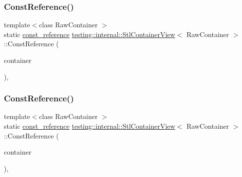 \mbox{\label{classtesting_1_1internal_1_1_stl_container_view_a36eccf53329730f6e55c12002128bf25}} 
\subsubsection{\texorpdfstring{ConstReference()}{ConstReference()}\hspace{0.1cm}{\footnotesize\ttfamily [2/3]}}
{\footnotesize\ttfamily template$<$class Raw\+Container $>$ \\
static \mbox{\hyperlink{classtesting_1_1internal_1_1_stl_container_view_a9cd4f6ed689b3938cdb7b3c4cbf1b36b}{const\+\_\+reference}} \mbox{\hyperlink{classtesting_1_1internal_1_1_stl_container_view}{testing\+::internal\+::\+Stl\+Container\+View}}$<$ Raw\+Container $>$\+::Const\+Reference (\begin{DoxyParamCaption}\item[{const Raw\+Container \&}]{container }\end{DoxyParamCaption})\hspace{0.3cm}{\ttfamily [inline]}, {\ttfamily [static]}}

\mbox{\label{classtesting_1_1internal_1_1_stl_container_view_a36eccf53329730f6e55c12002128bf25}} 
\subsubsection{\texorpdfstring{ConstReference()}{ConstReference()}\hspace{0.1cm}{\footnotesize\ttfamily [3/3]}}
{\footnotesize\ttfamily template$<$class Raw\+Container $>$ \\
static \mbox{\hyperlink{classtesting_1_1internal_1_1_stl_container_view_a9cd4f6ed689b3938cdb7b3c4cbf1b36b}{const\+\_\+reference}} \mbox{\hyperlink{classtesting_1_1internal_1_1_stl_container_view}{testing\+::internal\+::\+Stl\+Container\+View}}$<$ Raw\+Container $>$\+::Const\+Reference (\begin{DoxyParamCaption}\item[{const Raw\+Container \&}]{container }\end{DoxyParamCaption})\hspace{0.3cm}{\ttfamily [inline]}, {\ttfamily [static]}}

